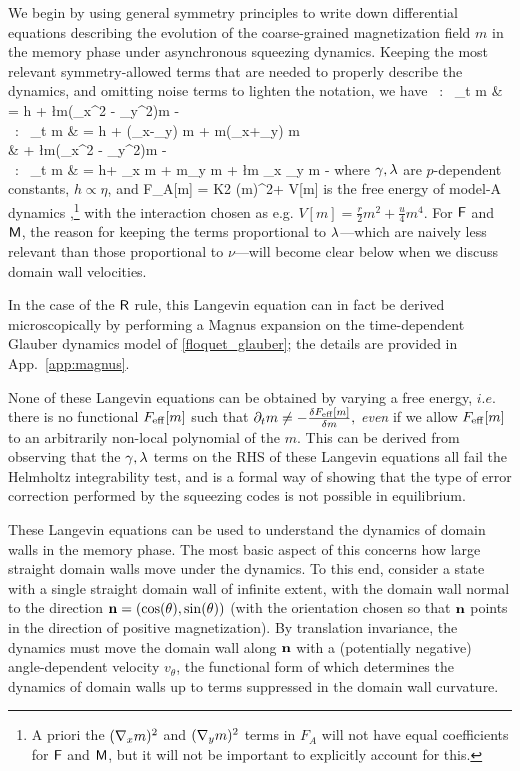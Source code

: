 \documentclass[pra,aps,twocolumn,groupedaddress,superscriptaddress,nofootinbib,preprintnumbers]{revtex4-2}
\begin{document}
	We begin by using general symmetry principles to write down differential equations describing the evolution of the coarse-grained magnetization field $m$ in the memory phase under asynchronous squeezing dynamics.
	Keeping the most relevant symmetry-allowed terms that are needed to properly describe the dynamics, and omitting noise terms to lighten the notation, we have 
	\bea \label{langevins} \sfR \, : \, \p_t m & = h + \l m(\D_x^2 - \D_y^2)m -  \\ 
	\sfF\, : \, \p_t m & = h + \g (\D_x-\D_y) m + \nu m(\D_x+\D_y) m  \\ & \qq + \l m(\D_x^2 - \D_y^2)m -   \\ 
	\sfM \, : \, \p_t m & = h+ \g \D_x m + \nu m\D_y m   + \l m \D_x \D_y m -  
	\eea 
	where $\gamma,\lambda$ are $p$-dependent constants, $h\propto \eta$, and 
	\be F_A[m] = \frac K2 (\nabla m)^2+ V[m]\ee 
	is the free energy of model-A dynamics \cite{hohenberg1977theory},\footnote{A priori the $(\nabla_xm)^2$ and $(\nabla_y m)^2$ terms in $F_A$ will not have equal coefficients for $\mathsf{F}$ and $\mathsf{M}$, but it will not be important to explicitly account for this.} with the interaction chosen as e.g.  $V[m] = \frac r2 m^2 + \frac u4 m^4$. For $\mathsf{F}$ and $\mathsf{M}$, the reason for keeping the terms proportional to $\lambda$---which are naively less relevant than those proportional to $\nu$---will become clear below when we discuss domain wall velocities. 	
	
	In the case of the $\mathsf{R}$ rule, this Langevin equation can in fact be derived microscopically by performing a Magnus expansion on the time-dependent Glauber dynamics model of \eqref{floquet_glauber}; the details are provided in App.~\ref{app:magnus}. 
	
	None of these Langevin equations can be obtained by varying a free energy, $i.e.$ there is no functional $F_{\rm eff}[m]$ such that $\partial_t m \neq -\frac{\delta F_{\rm eff}[m]}{\delta m},$ {\it even} if we allow $F_{\rm eff}[m]$ to an arbitrarily non-local polynomial of the $m$. This can be derived from observing that the $\gamma,\lambda$ terms on the RHS of these Langevin equations all fail the Helmholtz integrability test, and is a formal way of showing that the type of error correction performed by the squeezing codes is not possible in equilibrium. 
	
	These Langevin equations can be used to understand the dynamics of domain walls in the memory phase. The most basic aspect of this concerns how large straight domain walls move under the dynamics.	
	To this end, consider a state with a single straight domain wall of infinite extent, with the domain wall normal to the direction $\mathbf{n} = (\cos(\theta),\sin(\theta))$ (with the orientation chosen so that $\mathbf{n}$ points in the direction of positive magnetization). By translation invariance, the dynamics must move the domain wall along $\mathbf{n}$ with a (potentially negative) angle-dependent velocity $v_\theta$, the functional form of which determines the dynamics of domain walls up to terms suppressed in the domain wall curvature. 
	
\end{document}
